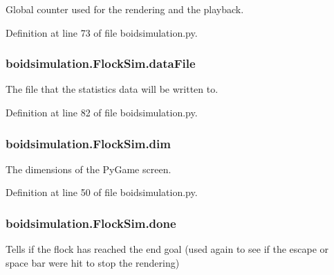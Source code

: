Global counter used for the rendering and the playback. 



Definition at line 73 of file boidsimulation.\-py.

\hypertarget{classboidsimulation_1_1FlockSim_a96885e067ac2333f807eaa9580a2ece4}{
\subsubsection[{data\-File}]{\setlength{\rightskip}{0pt plus 5cm}boidsimulation.\-Flock\-Sim.\-data\-File}}\label{classboidsimulation_1_1FlockSim_a96885e067ac2333f807eaa9580a2ece4}


The file that the statistics data will be written to. 



Definition at line 82 of file boidsimulation.\-py.

\hypertarget{classboidsimulation_1_1FlockSim_a2ba5ffd4d4ef009af8735d838eaf59d3}{
\subsubsection[{dim}]{\setlength{\rightskip}{0pt plus 5cm}boidsimulation.\-Flock\-Sim.\-dim}}\label{classboidsimulation_1_1FlockSim_a2ba5ffd4d4ef009af8735d838eaf59d3}


The dimensions of the Py\-Game screen. 



Definition at line 50 of file boidsimulation.\-py.

\hypertarget{classboidsimulation_1_1FlockSim_a970e9fcbc5d69b3987f226af5249038a}{
\subsubsection[{done}]{\setlength{\rightskip}{0pt plus 5cm}boidsimulation.\-Flock\-Sim.\-done}}\label{classboidsimulation_1_1FlockSim_a970e9fcbc5d69b3987f226af5249038a}


Tells if the flock has reached the end goal (used again to see if the escape or space bar were hit to stop the rendering) 



